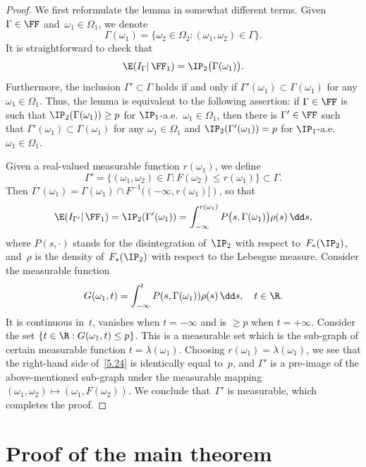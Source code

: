 \begin{proof}
We first reformulate the lemma in somewhat different terms. Given $\Gamma\in\FF$ and~$\omega_1\in\Omega_1$, we denote
\[
\Gamma(\omega_1)
=\{\omega_2\in\Omega_2:(\omega_1,\omega_2)\in\Gamma\}.
\]
It is straightforward to check that
\[
\E(I_\Gamma|\,\FF_1)=\IP_2\bigl(\Gamma(\omega_1)\bigr).
\]
Furthermore, the inclusion $\Gamma'\subset\Gamma$ holds if and only if $\Gamma'(\omega_1)\subset\Gamma(\omega_1)$ for any $\omega_1\in\Omega_1$. Thus, the lemma is equivalent to the following assertion: if $\Gamma\in\FF$ is such that $\IP_2(\Gamma(\omega_1))\ge p$ for $\IP_1$-a.e.\ $\omega_1\in\Omega_1$, then there is $\Gamma'\in\FF$ such that $\Gamma'(\omega_1)\subset\Gamma(\omega_1)$ for any $\omega_1\in\Omega_1$ and $\IP_2(\Gamma'(\omega_1))= p$ for $\IP_1$-a.e.\ $\omega_1\in\Omega_1$.

Given a real-valued measurable function $r(\omega_1)$, we define
\[
\Gamma'=\{(\omega_1,\omega_2)\in\Gamma:
F(\omega_2)\le r(\omega_1)\}\subset\Gamma.
\]
Then $\Gamma'(\omega_1)=\Gamma(\omega_1)\cap F^{-1}((-\infty,r(\omega_1)])$, so that
\begin{equation} \label{5.24}
\E(I_{\Gamma'}|\,\FF_1)=\IP_2(\Gamma'(\omega_1))
=\int_{-\infty}^{r(\omega_1)}
P\bigl(s,\Gamma(\omega_1)\bigr)\rho(s)\,\dd s,
\end{equation}
where $P(s,\cdot)$ stands for the disintegration of~$\IP_2$ with respect to~$F_*(\IP_2)$, and~$\rho$ is the density of~$F_*(\IP_2)$ with respect to the Lebesgue measure. Consider the measurable function
\[
G(\omega_1, t) = \int_{-\infty}^t P(s, \Gamma(\omega_1)) \rho(s)\,\dd s, \quad t\in\R.
\]
It is continuous in~$t$, vanishes when $t=-\infty$ and is $\ge p$ when $t=+\infty$. Consider the set $\{t\in \R:G(\omega_1,t)\le p\}$. This is a measurable set which is the sub-graph of certain measurable function $t=\lambda(\omega_1)$. Choosing $r(\omega_1) = \lambda(\omega_1)$, we see that the right-hand side of~\eqref{5.24} is identically equal to~$p$, and $\Gamma'$ is a pre-image of the above-mentioned sub-graph under the measurable mapping $(\omega_1, \omega_2)\mapsto (\omega_1, F(\omega_2))$. We conclude that~$\Gamma'$ is measurable, which completes the proof.
\end{proof}

\section{Proof of the main theorem}
\label{s3}

